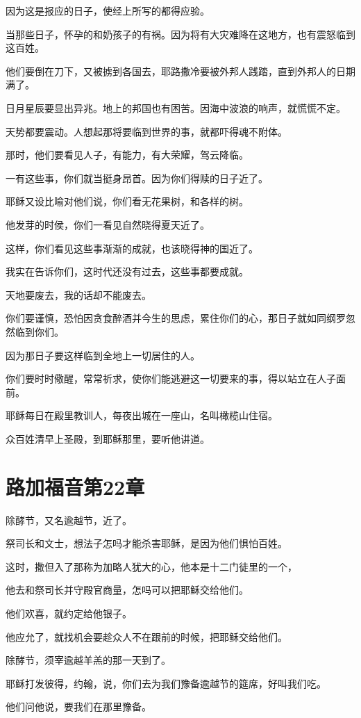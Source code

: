 \documentclass[12pt,oneside]{book}
\begin{document}
因为这是报应的日子，使经上所写的都得应验。

当那些日子，怀孕的和奶孩子的有祸。因为将有大灾难降在这地方，也有震怒临到这百姓。

他们要倒在刀下，又被掳到各国去，耶路撒冷要被外邦人践踏，直到外邦人的日期满了。

日月星辰要显出异兆。地上的邦国也有困苦。因海中波浪的响声，就慌慌不定。

天势都要震动。人想起那将要临到世界的事，就都吓得魂不附体。

那时，他们要看见人子，有能力，有大荣耀，驾云降临。

一有这些事，你们就当挺身昂首。因为你们得赎的日子近了。

耶稣又设比喻对他们说，你们看无花果树，和各样的树。

他发芽的时侯，你们一看见自然晓得夏天近了。

这样，你们看见这些事渐渐的成就，也该晓得神的国近了。

我实在告诉你们，这时代还没有过去，这些事都要成就。

天地要废去，我的话却不能废去。

你们要谨慎，恐怕因贪食醉酒并今生的思虑，累住你们的心，那日子就如同纲罗忽然临到你们。

因为那日子要这样临到全地上一切居住的人。

你们要时时儆醒，常常祈求，使你们能逃避这一切要来的事，得以站立在人子面前。

耶稣每日在殿里教训人，每夜出城在一座山，名叫橄榄山住宿。

众百姓清早上圣殿，到耶稣那里，要听他讲道。

\chapter{路加福音第22章}
除酵节，又名逾越节，近了。

祭司长和文士，想法子怎吗才能杀害耶稣，是因为他们惧怕百姓。

这时，撒但入了那称为加略人犹大的心，他本是十二门徒里的一个，

他去和祭司长并守殿官商量，怎吗可以把耶稣交给他们。

他们欢喜，就约定给他银子。

他应允了，就找机会要趁众人不在跟前的时候，把耶稣交给他们。

除酵节，须宰逾越羊羔的那一天到了。

耶稣打发彼得，约翰，说，你们去为我们豫备逾越节的筵席，好叫我们吃。

他们问他说，要我们在那里豫备。
\end{document}
